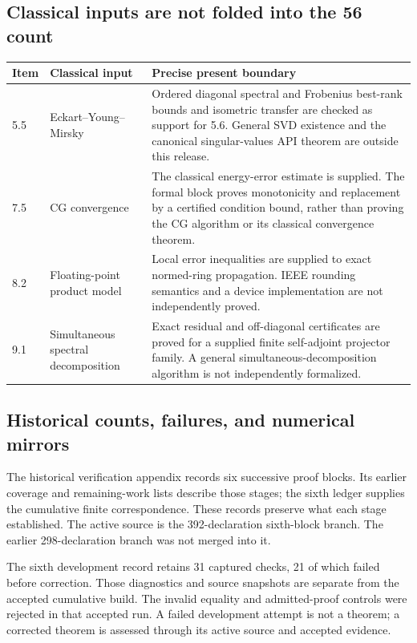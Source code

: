\subsection{Classical inputs are not folded into the 56 count}
\begin{longtable}{@{}p{.16\linewidth}p{.27\linewidth}p{.50\linewidth}@{}}
\toprule Item & Classical input & Precise present boundary\\\midrule\endhead
5.5 & Eckart--Young--Mirsky & Ordered diagonal spectral and Frobenius best-rank bounds and isometric transfer are checked as support for 5.6. General SVD existence and the canonical singular-values API theorem are outside this release.\\
7.5 & CG convergence & The classical energy-error estimate is supplied. The formal block proves monotonicity and replacement by a certified condition bound, rather than proving the CG algorithm or its classical convergence theorem.\\
8.2 & Floating-point product model & Local error inequalities are supplied to exact normed-ring propagation. IEEE rounding semantics and a device implementation are not independently proved.\\
9.1 & Simultaneous spectral decomposition & Exact residual and off-diagonal certificates are proved for a supplied finite self-adjoint projector family. A general simultaneous-decomposition algorithm is not independently formalized.\\
\bottomrule\end{longtable}

\subsection{Historical counts, failures, and numerical mirrors}
The historical verification appendix records six successive proof blocks. Its earlier coverage and remaining-work lists describe those stages; the sixth ledger supplies the cumulative finite correspondence. These records preserve what each stage established. The active source is the 392-declaration sixth-block branch. The earlier 298-declaration branch was not merged into it.

The sixth development record retains 31 captured checks, 21 of which failed before correction. Those diagnostics and source snapshots are separate from the accepted cumulative build. The invalid equality and admitted-proof controls were rejected in that accepted run. A failed development attempt is not a theorem; a corrected theorem is assessed through its active source and accepted evidence.

